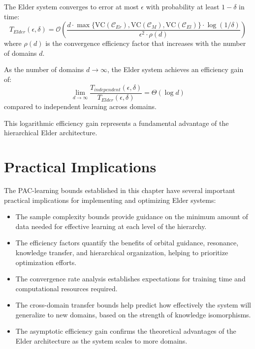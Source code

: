 \begin{theorem}
The Elder system converges to error at most $\epsilon$ with probability at least $1 - \delta$ in time:
\begin{equation}
T_{Elder}(\epsilon, \delta) = \mathcal{O}\left(\frac{d \cdot \max\{\text{VC}(\mathcal{C}_{Er}), \text{VC}(\mathcal{C}_{M}), \text{VC}(\mathcal{C}_{El})\} \cdot \log(1/\delta)}{\epsilon^2 \cdot \rho(d)}\right)
\end{equation}
where $\rho(d)$ is the convergence efficiency factor that increases with the number of domains $d$.
\end{theorem}

\begin{corollary}
As the number of domains $d \rightarrow \infty$, the Elder system achieves an efficiency gain of:
\begin{equation}
\lim_{d \rightarrow \infty} \frac{T_{independent}(\epsilon, \delta)}{T_{Elder}(\epsilon, \delta)} = \Theta(\log d)
\end{equation}
compared to independent learning across domains.
\end{corollary}

This logarithmic efficiency gain represents a fundamental advantage of the hierarchical Elder architecture.



\section{Practical Implications}

The PAC-learning bounds established in this chapter have several important practical implications for implementing and optimizing Elder systems:

\begin{itemize}
    \item The sample complexity bounds provide guidance on the minimum amount of data needed for effective learning at each level of the hierarchy.
    
    \item The efficiency factors quantify the benefits of orbital guidance, resonance, knowledge transfer, and hierarchical organization, helping to prioritize optimization efforts.
    
    \item The convergence rate analysis establishes expectations for training time and computational resources required.
    
    \item The cross-domain transfer bounds help predict how effectively the system will generalize to new domains, based on the strength of knowledge isomorphisms.
    
    \item The asymptotic efficiency gain confirms the theoretical advantages of the Elder architecture as the system scales to more domains.
\end{itemize}

